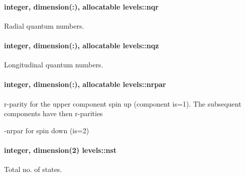 \paragraph[{\texorpdfstring{nqr}{nqr}}]{\setlength{\rightskip}{0pt plus 5cm}integer, dimension(\+:), allocatable levels\+::nqr}\hypertarget{namespacelevels_a3a3fdd724fc4182517f3e6b94cd503ed}{}\label{namespacelevels_a3a3fdd724fc4182517f3e6b94cd503ed}


Radial quantum numbers. 

\paragraph[{\texorpdfstring{nqz}{nqz}}]{\setlength{\rightskip}{0pt plus 5cm}integer, dimension(\+:), allocatable levels\+::nqz}\hypertarget{namespacelevels_a7477bf7a01308e1450bd9b8b0a7b3b05}{}\label{namespacelevels_a7477bf7a01308e1450bd9b8b0a7b3b05}


Longitudinal quantum numbers. 

\paragraph[{\texorpdfstring{nrpar}{nrpar}}]{\setlength{\rightskip}{0pt plus 5cm}integer, dimension(\+:), allocatable levels\+::nrpar}\hypertarget{namespacelevels_a2c9b0cdf673a4c98cbe3f5742545e4b9}{}\label{namespacelevels_a2c9b0cdf673a4c98cbe3f5742545e4b9}


r-\/parity for the upper component spin up (component {\ttfamily is=1}). The subsequent components have then r-\/parities 


\begin{DoxyItemize}
\item -\/nrpar for spin down (is=2) 
\end{DoxyItemize}
\paragraph[{\texorpdfstring{nst}{nst}}]{\setlength{\rightskip}{0pt plus 5cm}integer, dimension(2) levels\+::nst}\hypertarget{namespacelevels_ab8eb028f61bdfcc376968b23bacdb68f}{}\label{namespacelevels_ab8eb028f61bdfcc376968b23bacdb68f}


Total no. of states. 

